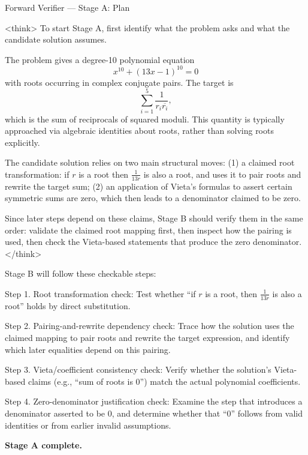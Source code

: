 \documentclass[11pt]{article}
\begin{document}
\begin{exbox}{Forward Verifier — Stage A: Plan}

<think>
To start Stage A, first identify what the problem asks and what the candidate
solution assumes.

The problem gives a degree-10 polynomial equation
\[
x^{10} + (13x - 1)^{10} = 0
\]
with roots occurring in complex conjugate pairs. The target is
\[
\sum_{i=1}^{5} \frac{1}{r_i \overline{r_i}},
\]
which is the sum of reciprocals of squared moduli. This quantity is typically
approached via algebraic identities about roots, rather than solving roots explicitly.

The candidate solution relies on two main structural moves:
(1) a claimed root transformation: if \(r\) is a root then \(\frac{1}{13r}\) is also a root,
and uses it to pair roots and rewrite the target sum;
(2) an application of Vieta’s formulas to assert certain symmetric sums are zero,
which then leads to a denominator claimed to be zero.

Since later steps depend on these claims, Stage B should verify them in the same
order: validate the claimed root mapping first, then inspect how the pairing is used,
then check the Vieta-based statements that produce the zero denominator.
</think>

Stage B will follow these checkable steps:

Step 1. Root transformation check:
    Test whether “if \(r\) is a root, then \(\frac{1}{13r}\) is also a root” holds by direct substitution.

Step 2. Pairing-and-rewrite dependency check:
    Trace how the solution uses the claimed mapping to pair roots and rewrite the target expression,
    and identify which later equalities depend on this pairing.

Step 3. Vieta/coefficient consistency check:
    Verify whether the solution’s Vieta-based claims (e.g., “sum of roots is 0”) match the actual polynomial coefficients.

Step 4. Zero-denominator justification check:
    Examine the step that introduces a denominator asserted to be 0, and determine whether that “0” follows from valid identities or from earlier invalid assumptions.

\textbf{Stage A complete.}

\end{exbox}
\end{document}
